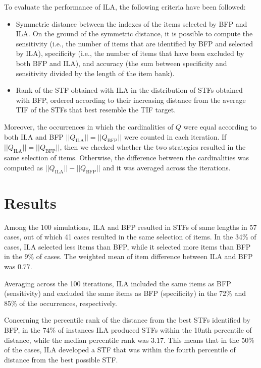 \documentclass[12pt, a4paper, titilepage]{article}
\begin{document}
To evaluate the performance of ILA, the following criteria have been followed: 

\begin{itemize}
	\item  Symmetric distance between the indexes of the items selected by BFP and ILA. On the ground of the symmetric distance, it is possible to compute the sensitivity (i.e., the number of items that are identified by BFP and selected by ILA), specificity (i.e., the number of items that have been excluded by both BFP and ILA), and accuracy (the sum between specificity and sensitivity divided by the length of the item bank).
	
	\item  Rank of the STF obtained with ILA in the distribution of STFs obtained with BFP, ordered according to their increasing distance from the average TIF of the STFs that best resemble the TIF target. 
	
\end{itemize}


Moreover, the occurrences in which the cardinalities of $Q$ were equal according to both ILA and BFP $||Q_{\text{ILA}}|| = ||Q_{\text{BFP}}||$ were counted in each iteration. 
If $||Q_{\text{ILA}}|| = ||Q_{\text{BFP}}||$, then we checked whether the two strategies resulted in the same selection of items. 
Otherwise, the difference between the cardinalities was computed as $||Q_{\text{ILA}}|| - ||Q_{\text{BFP}}||$ and it was averaged across the iterations. 

\section*{Results}

Among the 100 simulations, ILA and BFP resulted in STFs of same lengths in 57 cases, out of which 41 cases resulted in the same selection of items. In the 34\% of cases, ILA selected less items than BFP, while it selected more items than BFP in the 9\% of cases. The weighted mean of item difference between ILA and BFP was $0.77$. 

Averaging across the 100 iterations, ILA included the same items as BFP (sensitivity) and excluded the same items as BFP (specificity) in the 72\% and 85\% of the occurrences, respectively. 

Concerning the percentile rank of the distance from the best STFs identified by BFP, in the 74\% of instances ILA produced STFs within the 10nth percentile of distance, while the median percentile rank was $3.17$. This means that in the 50\% of the cases, ILA developed a STF that was within the fourth percentile of distance from the best possible STF. 
\end{document}
